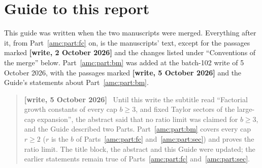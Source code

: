 \documentclass[11pt,letterpaper]{article}
\theoremstyle{remark}\newtheorem{remark}[theorem]{Remark}
\newenvironment{writenotedated}[1]{\par\smallskip\begin{quote}\small\textbf{[write, #1]}\ }{\end{quote}\smallskip}
\begin{document}
\section*{Guide to this report}
\label{amc:guide}
This guide was written when the two manuscripts were merged. Everything after it, from Part~\ref{amc:part:fc} on, is the manuscripts' text, except for the passages marked \textbf{[write, 2 October 2026]} and the changes listed under ``Conventions of the merge'' below. Part~\ref{amc:part:bm} was added at the batch-102 write of 5 October 2026, with the passages marked \textbf{[write, 5 October 2026]} and the Guide's statements about Part~\ref{amc:part:bm}.
\begin{writenotedated}{5 October 2026}
Until this write the subtitle read ``Factorial growth constants of every cap $b\ge3$, and fixed Taylor sectors of the large-cap expansion'', the abstract said that no ratio limit was claimed for $b\ge3$, and the Guide described two Parts. Part~\ref{amc:part:bm} covers every cap $r\ge2$ ($r$ is the $b$ of Parts~\ref{amc:part:fc} and~\ref{amc:part:sec}) and proves the ratio limit. The title block, the abstract and this Guide were updated; the earlier statements remain true of Parts~\ref{amc:part:fc} and~\ref{amc:part:sec}.
\end{writenotedated}
\end{document}
